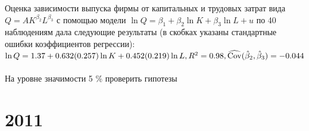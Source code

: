 \documentclass[addpoints, answers]{exam} %
\begin{document}
\begin{questions}
\question  Оценка зависимости выпуска фирмы от капитальных и трудовых затрат вида $Q=AK^{\beta_2}L^{\beta_3}$ с помощью модели $\ln Q=\beta_1+\beta_2\ln K+\beta_3\ln L+u$ по 40 наблюдениям дала следующие результаты (в скобках указаны стандартные ошибки коэффициентов регрессии):\\
$\ln Q=1.37+0.632 (0.257)\ln K+0.452(0.219)\ln L, R^2=0.98, \widehat{\operatorname{Cov}}(\hat{\beta}_2,\hat{\beta}_3)=-0.044$\\
\\На уровне значимости 5 \% проверить гипотезы

\end{questions}
\newpage
\section{2011}
\end{document}
